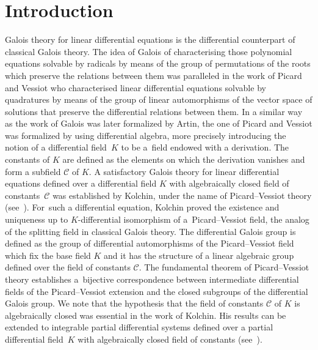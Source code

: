 \documentclass[pdftex]{sigma}%
\numberwithin{equation}{section}
\begin{document}
\vspace{1mm}

\vspace{1mm}

\vspace{1mm}
\section{Introduction}
Galois theory for linear differential equations is the differential counterpart of classical Galois theory. The idea of Galois of characterising those polynomial equations solvable by radicals by means of the group of permutations of the roots which preserve the relations between them was paralleled in the work of Picard and Vessiot who characterised linear differential equations solvable by quadratures by means of the group of linear automorphisms of the vector space of solutions that preserve the differential relations between them. In a similar way as the work of Galois was later forma\-li\-zed by Artin, the one of Picard and Vessiot was forma\-li\-zed by using differential algebra, more precisely introducing the notion of a differential field~$K$ to be a~field endowed with a derivation. The constants of $K$ are defined as the elements on which the derivation vanishes and form a subfield $\mathcal{C}$ of $K$. A satisfactory Galois theory for linear differential equations defined over a differential field $K$ with algebraically closed field of constants~$\mathcal{C}$ was established by Kolchin, under the name of Picard--Vessiot theory (see~\cite{Kol0}). For~such a differential equation, Kolchin proved the existence and uniqueness up to $K$-differential isomorphism of a~Picard--Vessiot field, the analog of the splitting field in classical Galois theo\-ry. The differential Galois group is defined as the group of differential automorphisms of the Picard--Vessiot field which fix the base field $K$ and it has the structure of a linear algebraic group defined over the field of constants $\mathcal{C}$. The fundamental theorem of Picard--Vessiot theory establishes a~bijective correspondence between intermediate differential fields of the Picard--Vessiot extension and the closed subgroups of the differential Galois group. We note that the hypothesis that the field of constants $\mathcal{C}$ of $K$ is algebraically closed was essential in the work of Kolchin. His results can be extended to integrable partial differential systems defined over a partial differential field~$K$ with algebraically closed field of constants (see~\cite[Appendix~D]{PS}).
\end{document}
